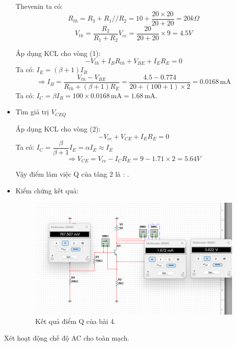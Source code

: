 \begin{itemize}[label=-]
	Thevenin ta có:
	\[ R_{th} = R_{3} + R_{1}//R_{2} = 10 + \dfrac{20\times 20}{20 + 20} = 20k\Omega\]
	\[ V_{th} = \dfrac{R_{2}}{R_{1} + R_{2}} V_{cc} = \dfrac{20}{20+20} \times 9 = 4.5V\]
	
	Áp dụng KCL cho vòng (1):
	\[ -V_{th} + I_{B}R_{th} + V_{BE} + I_{E}R_{E} = 0\]
	Ta có: $ I_{E} = (\beta + 1)I_{B} $
	\[\Rightarrow I_{B} = \dfrac{V_{th} - V_{BE}}{R_{th} + (\beta + 1)R_{E}} = \dfrac{4.5 - 0.774}{20 + (100+1)\times 2} = 0.0168\,\text{mA}\]
	Ta có: $I_{C} = \beta I_{B} = 100\times 0.0168\,\text{mA} = 1.68\,\text{mA}$.
	
	\item Tìm giá trị $V_{CEQ}$
	
	Áp dụng KCL cho vòng (2):
	\[ -V_{cc} + V_{CE} + I_{E}R_{E} = 0\]
	Ta có: $I_{C} = \dfrac{\beta}{\beta + 1}I_{E} = \alpha I_{E} \approx I_{E}$
	\[\Rightarrow V_{CE} = V_{cc} - I_{C}R_{E} = 9 - 1.71\times 2 = 5.64V \]
	
	Vậy điểm làm việc Q của tâng 2 là : .
	
	\item Kiểm chứng kết quả:
	
	\begin{figure}[H]
		\centering
		\includegraphics[width=.8\linewidth]{./my-chapters/my-images/Question4/phancucDC_Q.png}
		\caption{Kết quả điểm Q của bài 4.}
	\end{figure}
\end{itemize}


\noindent Xét hoạt động chế độ AC cho toàn mạch.

